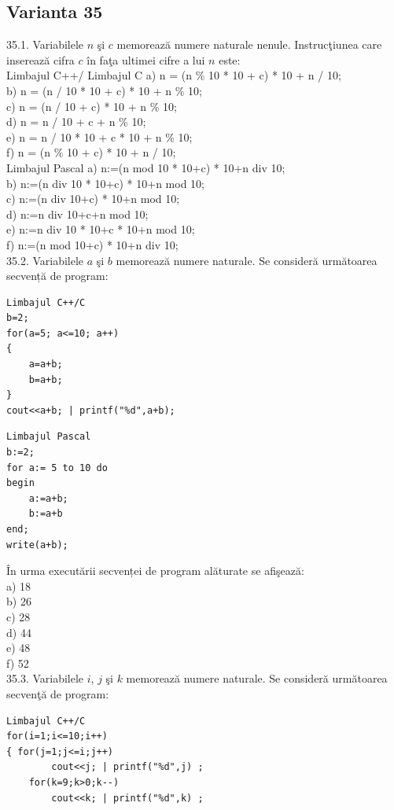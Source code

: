 \begin{itemize}
\begin{enumerate}
\section*{Varianta 35}

35.1. Variabilele $n$ şi $c$ memorează numere naturale nenule. Instrucţiunea care inserează cifra $c$ în faţa ultimei cifre a lui $n$ este:
\\
Limbajul C++/ Limbajul C
a) n = (n \% 10 * 10 + c) * 10 + n / 10;
\\
b) n = (n / 10 * 10 + c) * 10 + n \% 10;
\\
c) n = (n / 10 + c) * 10 + n \% 10;
\\
d) n = n / 10 + c + n \% 10;
\\
e) n = n / 10 * 10 + c * 10 + n \% 10;
\\
f) n = (n \% 10 + c) * 10 + n / 10;
\\
Limbajul Pascal
a) n:=(n mod 10 * 10+c) * 10+n div 10; 
\\
b) n:=(n div 10 * 10+c) * 10+n mod 10;
\\
c) n:=(n div 10+c) * 10+n mod 10;
\\
d) n:=n div 10+c+n mod 10;
\\
e) n:=n div 10 * 10+c * 10+n mod 10;
\\
f) n:=(n mod 10+c) * 10+n div 10;
\\
35.2. Variabilele $a$ şi $b$ memorează numere naturale. Se consideră următoarea secvență de program:
\begin{verbatim}
Limbajul C++/C
b=2;
for(a=5; a<=10; a++)
{
    a=a+b;
    b=a+b;
}
cout<<a+b; | printf("%d",a+b);
\end{verbatim}
\begin{verbatim}
Limbajul Pascal
b:=2;
for a:= 5 to 10 do
begin
    a:=a+b;
    b:=a+b
end;
write(a+b);
\end{verbatim}
În urma executării secvenței de program alăturate se afişează:
\\
a) 18
\\
b) 26
\\
c) 28
\\
d) 44
\\
e) 48
\\
f) 52
\\
35.3. Variabilele $i$, $j$ şi $k$ memorează numere naturale. Se consideră următoarea secvenţă de program:
\begin{verbatim}
Limbajul C++/C
for(i=1;i<=10;i++)
{ for(j=1;j<=i;j++)
        cout<<j; | printf("%d",j) ;
    for(k=9;k>0;k--)
        cout<<k; | printf("%d",k) ;

\end{verbatim}
\end{enumerate}
\end{itemize}
